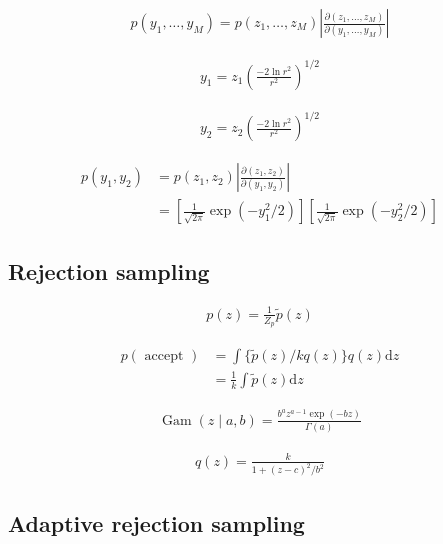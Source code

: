 \documentclass{article}
\begin{document}
\begin{align*}
p\left(y_{1}, \ldots, y_{M}\right)=p\left(z_{1}, \ldots, z_{M}\right)\left|\frac{\partial\left(z_{1}, \ldots, z_{M}\right)}{\partial\left(y_{1}, \ldots, y_{M}\right)}\right|
\tag{14.9}
\end{align*}

\begin{align*}
y_{1}=z_{1}\left(\frac{-2 \ln r^{2}}{r^{2}}\right)^{1 / 2}
\tag{14.10}
\end{align*}

\begin{align*}
y_{2}=z_{2}\left(\frac{-2 \ln r^{2}}{r^{2}}\right)^{1 / 2}
\tag{14.11}
\end{align*}

\begin{align*}
p\left(y_{1}, y_{2}\right) & =p\left(z_{1}, z_{2}\right)\left|\frac{\partial\left(z_{1}, z_{2}\right)}{\partial\left(y_{1}, y_{2}\right)}\right| \\
& =\left[
\frac{1}{\sqrt{2 \pi}} \exp \left(-y_{1}^{2} / 2\right)\right]
\left[
\frac{1}{\sqrt{2 \pi}} \exp \left(-y_{2}^{2} / 2\right)\right]
\tag{14.12}
\end{align*}

\subsection{Rejection sampling}

\begin{align*}
p(z)=\frac{1}{Z_{p}} \widetilde{p}(z)
\tag{14.13}
\end{align*}

\begin{align*}
p(\text{ accept }) & =\int\{\widetilde{p}(z) / k q(z)\} q(z) \mathrm{d} z \\
& =\frac{1}{k} \int \widetilde{p}(z) \mathrm{d} z
\tag{14.14}
\end{align*}

\begin{align*}
\operatorname{Gam}(z \mid a, b)=\frac{b^{a} z^{a-1} \exp (-b z)}{\Gamma(a)}
\tag{14.15}
\end{align*}

\begin{align*}
q(z)=\frac{k}{1+(z-c)^{2} / b^{2}}
\tag{14.16}
\end{align*}

\subsection{Adaptive rejection sampling}
\end{document}
